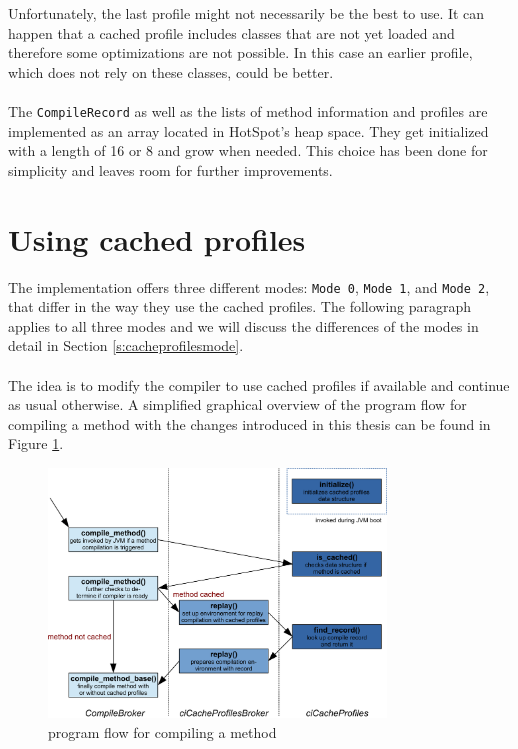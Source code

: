 Unfortunately, the last profile might not necessarily be the best to use. It can happen that a cached profile includes classes that are not yet loaded and therefore some optimizations are not possible. In this case an earlier profile, which does not rely on these classes, could be better.
\\\\
The \texttt{CompileRecord} as well as the lists of method information and profiles are implemented as an array located in HotSpot's heap space.
They get initialized with a length of 16 or 8 and grow when needed. This choice has been done for simplicity and leaves room for further improvements.

\section{Using cached profiles}
\label{s:usingprofiles}
The implementation offers three different modes: \texttt{Mode 0}, \texttt{Mode 1}, and \texttt{Mode 2}, that differ in the way they use the cached profiles.
The following paragraph applies to all three modes and we will discuss the differences of the modes in detail in Section \ref{s:cacheprofilesmode}.
\\\\
The idea is to modify the compiler to use cached profiles if available and continue as usual otherwise.
A simplified graphical overview of the program flow for compiling a method with the changes introduced in this thesis can be found in Figure \ref{f:programflow}.
\begin{figure}[ht!]
  \begin{center}
    \centering
    \includegraphics[width=0.8\textwidth]{figures/program_flow.png}
    \caption{program flow for compiling a method}
    \label{f:programflow}
  \end{center}
\end{figure}\\
